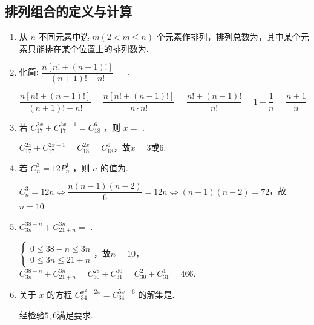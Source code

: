 \subsection*{排列组合的定义与计算}
\begin{enumerate}
    \item 从 $n$ 不同元素中选 $m\left( {2 < m \leq  n}\right)$ 个元素作排列，排列总数为，其中某个元素只能排在某个位置上的排列数为.

    \item 化简: $\dfrac{n\left\lbrack  {n! + \left( {n - 1}\right) !}\right\rbrack  }{\left( {n + 1}\right) ! - n!} =$ .
    \begin{jieda}
        $\dfrac{n\left\lbrack  {n! + \left( {n - 1}\right) !}\right\rbrack  }{\left( {n + 1}\right) ! - n!} = \dfrac{n\left\lbrack  {n! + \left( {n - 1}\right) !}\right\rbrack  }{n \cdot n!} = \dfrac{n! + \left( {n - 1}\right) !}{n!} = 1+\dfrac{1}{n} = \dfrac{n+1}{n}$
    \end{jieda}

    \item 若 ${C}_{17}^{2x} + {C}_{17}^{{2x} - 1} = {C}_{18}^{6}$ ，则 $x =$ .
    \begin{jieda}
        ${C}_{17}^{2x} + {C}_{17}^{{2x} - 1} = {C}_{18}^{2x} = {C}_{18}^{6}$，故$x = 3$或$6$.
    \end{jieda}

    \item 若 ${C}_{n}^{3} = {12}{P}_{n}^{1}$ ，则 $n$ 的值为.
    \begin{jieda}
        ${C}_{n}^{3} = {12}n \Longleftrightarrow \dfrac{n(n-1)(n-2)}{6} = 12n \Longleftrightarrow (n-1)(n-2) = 72$，故$n = 10$
    \end{jieda}

    \item ${C}_{3n}^{{38} - n} + {C}_{{21} + n}^{3n} =$ .
    \begin{jieda}
        $\left\{\begin{array}{l}
             0 \leq 38-n \leq 3n \\
             0 \leq 3n \leq 21+n
        \end{array}\right.$，故$n = 10$，${C}_{3n}^{{38} - n} + {C}_{{21} + n}^{3n} = C^{28}_{30}+C^{30}_{31} = C^2_{30}+C^1_{31}=466$.
    \end{jieda}

    \item 关于 $x$ 的方程 ${C}_{34}^{{x}^{2} - {2x}} = {C}_{34}^{{5x} - 6}$ 的解集是.
    \begin{jieda}
        经检验$5, 6$满足要求.
    \end{jieda}


\end{enumerate}
